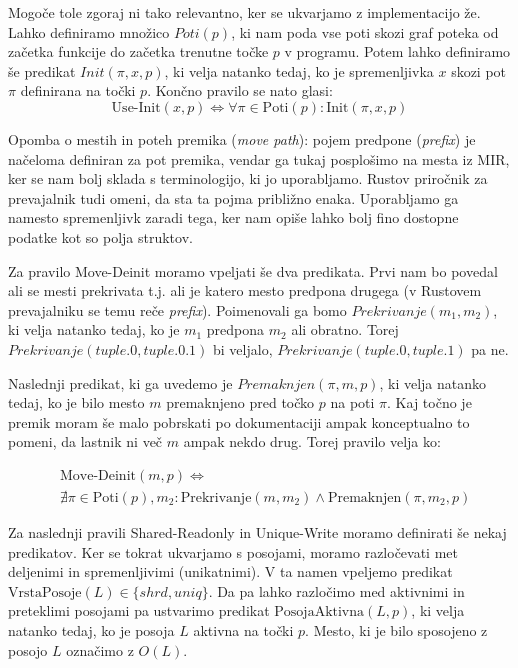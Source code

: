 \documentclass[a4paper,12pt,openright]{book}
\begin{document}
Mogoče tole zgoraj ni tako relevantno, ker se ukvarjamo z implementacijo že. Lahko definiramo množico
$Poti(p)$, ki nam poda vse poti skozi graf poteka od začetka funkcije do začetka trenutne točke $p$
v programu. Potem lahko definiramo še predikat $Init(\pi, x, p)$, ki velja natanko tedaj, ko je spremenljivka
$x$ skozi pot $\pi$ definirana na točki $p$. Končno pravilo se nato glasi:
\begin{equation}
	\text{Use-Init}(x, p) \iff \forall \pi \in \text{Poti}(p): \text{Init}(\pi, x, p)
\end{equation}

Opomba o mestih in poteh premika (\textit{move path}): pojem predpone (\textit{prefix}) je načeloma definiran za pot
premika, vendar ga tukaj posplošimo na mesta iz MIR, ker se nam bolj sklada s terminologijo, ki jo uporabljamo.
Rustov priročnik za prevajalnik tudi omeni, da sta ta pojma približno enaka. Uporabljamo ga namesto spremenljivk
zaradi tega, ker nam opiše lahko bolj fino dostopne podatke kot so polja struktov.

Za pravilo Move-Deinit moramo vpeljati še dva predikata. Prvi nam bo povedal ali se mesti
prekrivata t.j. ali je katero mesto predpona drugega (v Rustovem prevajalniku se temu reče \textit{prefix}). Poimenovali
ga bomo $Prekrivanje(m_{1}, m_{2})$, ki velja natanko tedaj, ko je $m_{1}$ predpona $m_{2}$ ali obratno. Torej
$Prekrivanje(tuple.0, tuple.0.1)$ bi veljalo, $Prekrivanje(tuple.0, tuple.1)$ pa ne.

Naslednji predikat, ki ga uvedemo je $Premaknjen(\pi, m, p)$, ki velja natanko tedaj, ko je bilo mesto $m$ premaknjeno
pred točko $p$ na poti $\pi$. Kaj točno je premik moram še malo pobrskati po dokumentaciji ampak konceptualno to pomeni,
da lastnik ni več $m$ ampak nekdo drug. Torej pravilo velja ko:

\begin{equation}
	\begin{aligned}
		 & \text{Move-Deinit}(m, p) \iff \\ &\nexists \pi \in \text{Poti}(p), m_{2}: \text{Prekrivanje}(m, m_{2}) \land \text{Premaknjen}(\pi, m_{2}, p)
	\end{aligned}
\end{equation}

Za naslednji pravili Shared-Readonly in Unique-Write moramo definirati še nekaj predikatov. Ker se tokrat
ukvarjamo s posojami, moramo razločevati met deljenimi in spremenljivimi (unikatnimi). V ta namen vpeljemo
predikat $\text{VrstaPosoje}(L) \in \{shrd, uniq\}$. Da pa lahko razločimo med aktivnimi in preteklimi posojami
pa ustvarimo predikat $\text{PosojaAktivna}(L,p)$, ki velja natanko tedaj, ko je posoja $L$ aktivna na točki $p$.
Mesto, ki je bilo sposojeno z posojo $L$ označimo z $O(L)$.
\end{document}
